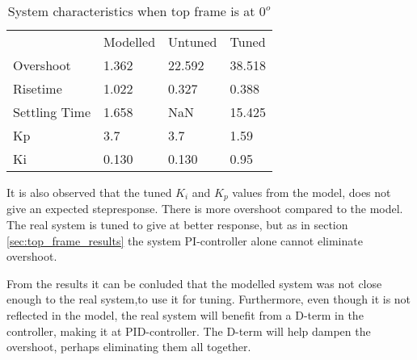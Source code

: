 \documentclass[../../Main]{subfiles}
\begin{document}
\begin{table}[H]
	\centering
	\begin{tabular}{*{4}{l}}
		&Modelled&Untuned&Tuned\\
		Overshoot&1.362&22.592&38.518\\
		Risetime&1.022&0.327&0.388\\
		Settling Time&1.658&NaN&15.425\\
		Kp&3.7&3.7&1.59\\
		Ki&0.130&0.130&0.95
	\end{tabular}
	\caption{System characteristics when top frame is at $0^o$}
	\label{tab:0_bot}
\end{table}

It is also observed that the tuned $K_i$ and $K_p$ values from the model, does not give an expected stepresponse. There is more overshoot compared to the model. The real system is tuned to give at better response, but as in section \ref{sec:top_frame_results} the system PI-controller alone cannot eliminate overshoot.

From the results it can be conluded that the modelled system was not close enough to the real system,to use it for tuning. Furthermore, even though it is not reflected in the model, the real system will benefit from a D-term in the controller, making it at PID-controller. The D-term will help dampen the overshoot, perhaps eliminating them all together. 
\end{document}
